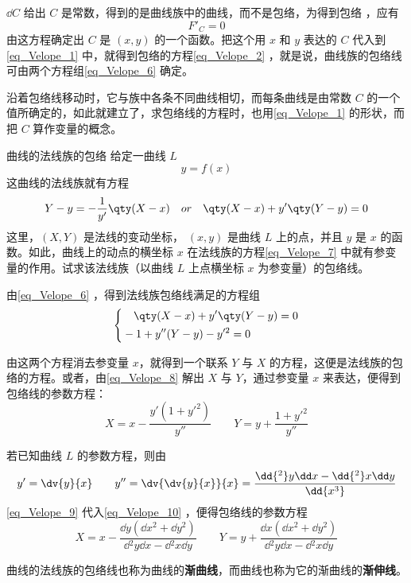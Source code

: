 $\dd C$ 给出 $C$ 是常数，得到的是曲线族中的曲线，而不是包络，为得到包络
，应有
\begin{equation}
F'_C=0
\end{equation}
由这方程确定出 $C$ 是 $(x,y)$ 的一个函数。把这个用 $x$ 和 $y$ 表达的 $C$ 代入到\autoref{eq_Velope_1} 中，就得到包络的方程\autoref{eq_Velope_2} ，就是说，曲线族的包络线可由两个方程组\autoref{eq_Velope_6} 确定。

沿着包络线移动时，它与族中各条不同曲线相切，而每条曲线是由常数 $C$ 的一个值所确定的，如此就建立了，求包络线的方程时，也用\autoref{eq_Velope_1} 的形状，而把 $C$ 算作变量的概念。
\begin{example}{曲线的法线族的包络}
给定一曲线 $L$
\begin{equation}
y=f(x)
\end{equation}
这曲线的法线族就有方程
\begin{equation}\label{eq_Velope_7}
Y-y=-\frac{1}{y'}\qty(X-x)\quad or\quad\qty(X-x)+y'\qty(Y-y)=0
\end{equation}
这里，$(X,Y)$ 是法线的变动坐标， $(x,y)$ 是曲线 $L$ 上的点，并且 $y$ 是 $x$ 的函数。如此，曲线上的动点的横坐标 $x$ 在法线族的方程\autoref{eq_Velope_7} 中就有参变量的作用。试求该法线族（以曲线 $L$ 上点横坐标 $x$ 为参变量）的包络线。

由\autoref{eq_Velope_6} ，得到法线族包络线满足的方程组
\begin{equation}\label{eq_Velope_8}
\left\{\begin{aligned}
&\quad\qty(X-x)+y'\qty(Y-y)=0\\
&-1+y''(Y-y)-y'^2=0
\end{aligned}\right.
\end{equation}
 

由这两个方程消去参变量 $x$，就得到一个联系 $Y$ 与 $X$ 的方程，这便是法线族的包络的方程。或者，由\autoref{eq_Velope_8} 解出 $X$ 与 $Y$，通过参变量 $x$ 来表达，便得到包络线的参数方程：
\begin{equation}\label{eq_Velope_10}
X=x-\frac{y'(1+y'^2)}{y''}\qquad Y=y+\frac{1+y'^2}{y''}
\end{equation}

若已知曲线 $L$ 的参数方程，则由
\begin{equation}\label{eq_Velope_9}
y'=\dv{y}{x}\qquad y''=\dv{\dv{y}{x}}{x}=\frac{\dd{^2}y\dd x-\dd{^2}x\dd y}{\dd{x^3}}
\end{equation}
\autoref{eq_Velope_9} 代入\autoref{eq_Velope_10} ，便得包络线的参数方程
\begin{equation}
X=x-\frac{\dd y(\dd x^2+\dd y^2)}{\dd{^2y\dd x}-\dd{^2x}\dd y}
\qquad Y=y+\frac{\dd x(\dd x^2+\dd y^2)}{\dd{^2y}\dd x-\dd{^2x}\dd y}
\end{equation}

曲线的法线族的包络线也称为曲线的\textbf{渐曲线}，而曲线也称为它的渐曲线的\textbf{渐伸线}。
\end{example}